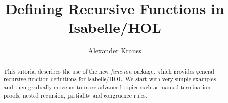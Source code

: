 \documentclass[11pt,a4paper,fleqn]{article}
\title{Defining Recursive Functions in Isabelle/HOL}
\author{Alexander Krauss}
\begin{document}
\maketitle

\begin{abstract}
  This tutorial describes the use of the new \emph{function} package,
	which provides general recursive function definitions for Isabelle/HOL.
	We start with very simple examples and then gradually move on to more
	advanced topics such as manual termination proofs, nested recursion,
	partiality and congruence rules.
\end{abstract}







\begingroup
 \small\raggedright\frenchspacing

\endgroup
\end{document}
